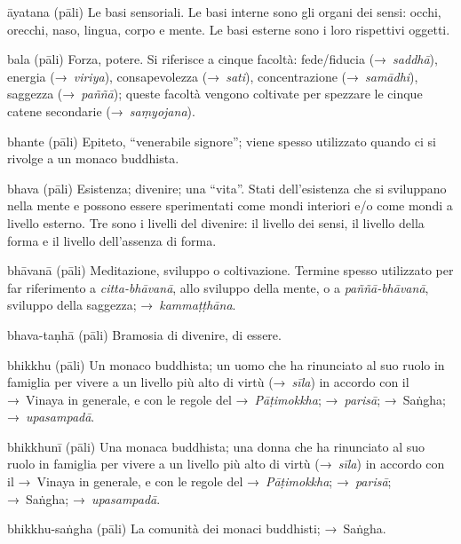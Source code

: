 \begin{glossarydescription}
\item[āyatana] (pāli) Le basi sensoriali. Le basi interne sono gli organi dei
  sensi: occhi, orecchi, naso, lingua, corpo e mente. Le basi esterne sono i
  loro rispettivi oggetti.


\item[bala] (pāli) Forza, potere. Si riferisce a cinque facoltà: fede/fiducia
  (→~\emph{saddhā}), energia (→~\emph{viriya}), consapevolezza (→~\emph{sati}),
  concentrazione (→~\emph{samādhi}), saggezza (→~\emph{paññā}); queste facoltà
  vengono coltivate per spezzare le cinque catene secondarie
  (→~\emph{saṃyojana}).

\item[bhante] (pāli) Epiteto, ``venerabile signore''; viene spesso utilizzato
  quando ci si rivolge a un monaco buddhista.

\item[bhava] (pāli) Esistenza; divenire; una ``vita''. Stati dell'esistenza che
  si sviluppano nella mente e possono essere sperimentati come mondi interiori
  e/o come mondi a livello esterno. Tre sono i livelli del divenire: il livello
  dei sensi, il livello della forma e il livello dell'assenza di forma.

\item[bhāvanā] (pāli) Meditazione, sviluppo o coltivazione. Termine spesso
  utilizzato per far riferimento a \emph{citta-bhāvanā}, allo sviluppo della
  mente, o a \emph{paññā-bhāvanā}, sviluppo della saggezza;
  →~\emph{kammaṭṭhāna}.

\item[bhava-taṇhā] (pāli) Bramosia di divenire, di essere.

\item[bhikkhu] (pāli) Un monaco buddhista; un uomo che ha rinunciato al suo
  ruolo in famiglia per vivere a un livello più alto di virtù (→~\emph{sīla}) in
  accordo con il →~Vinaya in generale, e con le regole del →~\emph{Pāṭimokkha};
  →~\emph{parisā}; →~Saṅgha; →~\emph{upasampadā}.

\item[bhikkhunī] (pāli) Una monaca buddhista; una donna che ha rinunciato al suo
  ruolo in famiglia per vivere a un livello più alto di virtù (→~\emph{sīla}) in
  accordo con il →~Vinaya in generale, e con le regole del →~\emph{Pāṭimokkha};
  →~\emph{parisā}; →~Saṅgha; →~\emph{upasampadā}.

\item[bhikkhu-saṅgha] (pāli) La comunità dei monaci buddhisti; →~Saṅgha.


\end{glossarydescription}

